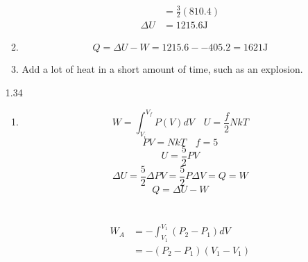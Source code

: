 \documentclass{article}
\begin{document}
\begin{enumerate}
\begin{enumerate}
\begin{align*}
                &= \frac{3}{2} (810.4) \\
                \Delta U &= 1215.6\si{\joule} 
            \end{align*}
        \vspace{0.05in}
        \item
            \begin{equation*}
                Q = \Delta U - W = 1215.6 - -405.2 = 1621\si{\joule}
            \end{equation*}
        \vspace{0.05in}
        \item
            Add a lot of heat in a short amount of time, such as an explosion.
    \end{enumerate}
    \vspace{0.1in}
    \item [1.34]
    \begin{enumerate}
        \item
            \begin{equation*}
                W = \int_{V_i}^{V_f} P(V) dV \quad U = \frac{f}{2}NkT
            \end{equation*}
            \begin{equation*}
                PV = NkT \quad f=5
            \end{equation*}
            \begin{equation*}
                U = \frac{5}{2}PV
            \end{equation*}
            \begin{equation*}
                \Delta U = \frac{5}{2} \Delta PV = \frac{5}{2} P \Delta V = Q = W
            \end{equation*}
            \begin{equation*}
                Q = \Delta U - W
            \end{equation*}
            \\ \\
            \begin{align*}
                W_A &= - \int_{V_1}^{V_1} (P_2 - P_1) dV \\
                &= -(P_2 - P_1)(V_1 - V_1) \\

\end{align*}
\end{enumerate}
\end{enumerate}
\end{document}
